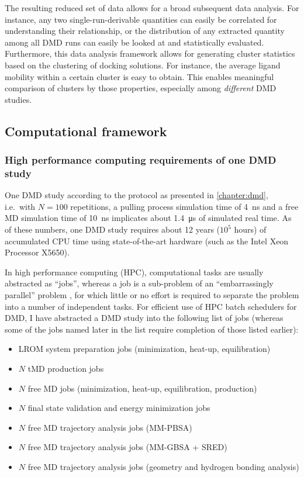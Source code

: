 The resulting reduced set of data allows for a broad subsequent data analysis.
For instance, any two single-run-derivable quantities can easily be correlated
for understanding their relationship, or the distribution of any extracted
quantity among all DMD runs can easily be looked at and statistically evaluated.
Furthermore, this data analysis framework allows for generating cluster
statistics based on the clustering of docking solutions. For instance, the
average ligand mobility within a certain cluster is easy to obtain. This enables
meaningful comparison of clusters by those properties, especially among
\textit{different} DMD studies.


\subsection{Computational framework}


\subsubsection{High performance computing requirements of one DMD study}

One DMD study according to the protocol as presented in \cref{chapter:dmd},
i.e.\ with $N = 100$ repetitions, a pulling process simulation time of
\SI{4}{\nano\second} and a free MD simulation time of \SI{10}{\nano\second}
implicates about \SI{1.4}{\micro\second} of simulated real time. As of these
numbers, one DMD study requires about 12 years ($10^5$ hours) of accumulated CPU
time using state-of-the-art hardware (such as the Intel Xeon Processor X5650).

In high performance computing (HPC), computational tasks are usually abstracted as
\enquote{jobs}, whereas a job is a sub-problem of an \enquote{embarrassingly
parallel} problem \cite{heath1986hypercube}, for which little or no effort is
required to separate the problem into a number of independent tasks. For
efficient use of HPC batch schedulers for DMD, I have abstracted a DMD study
into the following list of jobs (whereas some of the jobs named later in the
list require completion of those listed earlier):

\begin{itemize}
\item LROM system preparation jobs (minimization, heat-up, equilibration)
\item $N$ tMD production jobs
\item $N$ free MD jobs (minimization, heat-up, equilibration, production)
\item $N$ final state validation and energy minimization jobs
\item $N$ free MD trajectory analysis jobs (MM-PBSA)
\item $N$ free MD trajectory analysis jobs (MM-GBSA + SRED)
\item $N$ free MD trajectory analysis jobs (geometry and hydrogen bonding
analysis)
\end{itemize}

